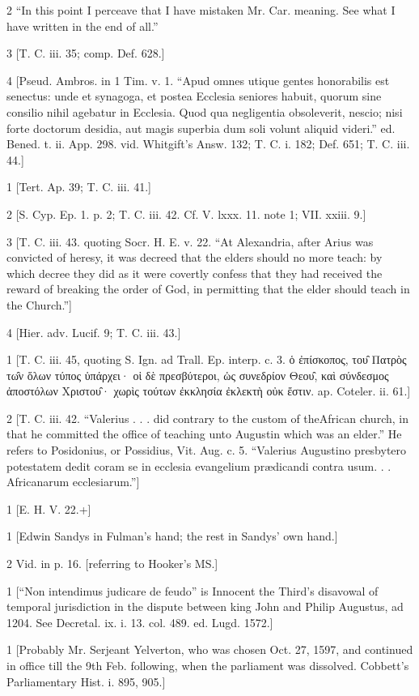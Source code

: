 2
“In this point I perceave that I have mistaken Mr. Car. meaning. See what I have written in the end of all.”

3
[T. C. iii. 35; comp. Def. 628.]

4
[Pseud. Ambros. in 1 Tim. v. 1. “Apud omnes utique gentes honorabilis est senectus: unde et synagoga, et postea Ecclesia seniores habuit, quorum sine consilio nihil agebatur in Ecclesia. Quod qua negligentia obsoleverit, nescio; nisi forte doctorum desidia, aut magis superbia dum soli volunt aliquid videri.” ed. Bened. t. ii. App. 298. vid. Whitgift’s Answ. 132; T. C. i. 182; Def. 651; T. C. iii. 44.]

1
[Tert. Ap. 39; T. C. iii. 41.]

2
[S. Cyp. Ep. 1. p. 2; T. C. iii. 42. Cf. V. lxxx. 11. note 1; VII. xxiii. 9.]

3
[T. C. iii. 43. quoting Socr. H. E. v. 22. “At Alexandria, after Arius was convicted of heresy, it was decreed that the elders should no more teach: by which decree they did as it were covertly confess that they had received the reward of breaking the order of God, in permitting that the elder should teach in the Church.”]

4
[Hier. adv. Lucif. 9; T. C. iii. 43.]

1
[T. C. iii. 45, quoting S. Ign. ad Trall. Ep. interp. c. 3. ὁ ἐπίσκοπος, του̑ Πατρὸς τω̑ν ὅλων τύπος ὑπάρχει· οἱ δὲ πρεσβύτεροι, ὡς συνεδρίον Θεου̑, καὶ σύνδεσμος ἀποστόλων Χριστου̑· χωρὶς τούτων ἐκκλησία ἐκλεκτὴ οὐκ ἔστιν. ap. Coteler. ii. 61.]

2
[T. C. iii. 42. “Valerius . . . did contrary to the custom of theAfrican church, in that he committed the office of teaching unto Augustin which was an elder.” He refers to Posidonius, or Possidius, Vit. Aug. c. 5. “Valerius Augustino presbytero potestatem dedit coram se in ecclesia evangelium prædicandi contra usum. . . Africanarum ecclesiarum.”]

1
[E. H. V. 22.+]

1
[Edwin Sandys in Fulman’s hand; the rest in Sandys’ own hand.]

2
Vid. in p. 16. [referring to Hooker’s MS.]

1
[“Non intendimus judicare de feudo” is Innocent the Third’s disavowal of temporal jurisdiction in the dispute between king John and Philip Augustus, ad 1204. See Decretal. ix. i. 13. col. 489. ed. Lugd. 1572.]

1
[Probably Mr. Serjeant Yelverton, who was chosen Oct. 27, 1597, and continued in office till the 9th Feb. following, when the parliament was dissolved. Cobbett’s Parliamentary Hist. i. 895, 905.]

